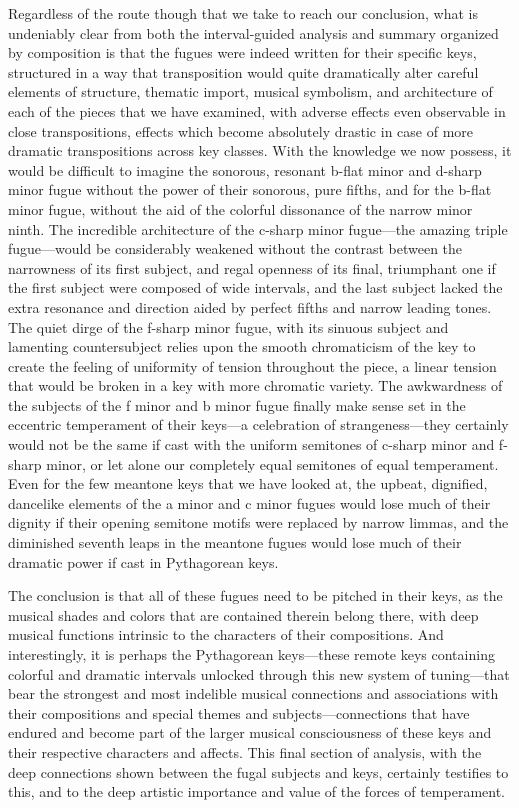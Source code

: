Regardless of the route though that we take to reach our conclusion,
what is undeniably clear from both the interval-guided analysis and
summary organized by composition is that the fugues were indeed written
for their specific keys, structured in a way that transposition would
quite dramatically alter careful elements of structure, thematic import,
musical symbolism, and architecture of each of the pieces that we have
examined, with adverse effects even observable in close transpositions,
effects which become absolutely drastic in case of more dramatic
transpositions across key classes. With the knowledge we now possess, it
would be difficult to imagine the sonorous, resonant b-flat minor and
d-sharp minor fugue without the power of their sonorous, pure fifths,
and for the b-flat minor fugue, without the aid of the colorful
dissonance of the narrow minor ninth. The incredible architecture of the
c-sharp minor fugue---the amazing triple fugue---would be
considerably weakened without the contrast between the narrowness of its
first subject, and regal openness of its final, triumphant one if the
first subject were composed of wide intervals, and the last subject
lacked the extra resonance and direction aided by perfect fifths and
narrow leading tones. The quiet dirge of the f-sharp minor fugue, with
its sinuous subject and lamenting countersubject relies upon the smooth
chromaticism of the key to create the feeling of uniformity of tension
throughout the piece, a linear tension that would be broken in a key
with more chromatic variety. The awkwardness of the subjects of the f
minor and b minor fugue finally make sense set in the eccentric
temperament of their keys---a celebration of strangeness---they
certainly would not be the same if cast with the uniform semitones of
c-sharp minor and f-sharp minor, or let alone our completely equal
semitones of equal temperament. Even for the few meantone keys that we
have looked at, the upbeat, dignified, dancelike elements of the a minor
and c minor fugues would lose much of their dignity if their opening
semitone motifs were replaced by narrow limmas, and the diminished
seventh leaps in the meantone fugues would lose much of their dramatic
power if cast in Pythagorean keys.

The conclusion is that all of these fugues need to be pitched in their
keys, as the musical shades and colors that are contained therein belong
there, with deep musical functions intrinsic to the characters of their
compositions. And interestingly, it is perhaps the Pythagorean
keys---these remote keys containing colorful and dramatic intervals
unlocked through this new system of tuning---that bear the strongest
and most indelible musical connections and associations with their
compositions and special themes and subjects---connections that have
endured and become part of the larger musical consciousness of these
keys and their respective characters and affects. This final section of
analysis, with the deep connections shown between the fugal subjects and
keys, certainly testifies to this, and to the deep artistic importance
and value of the forces of temperament.


    
    
    
